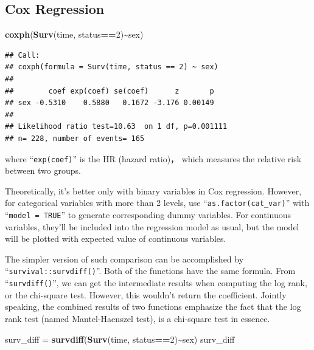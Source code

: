 \documentclass[
]{ctexart}
\newenvironment{Shaded}{\begin{snugshade}}{\end{snugshade}}
\newcommand{\DecValTok}[1]{\textcolor[rgb]{0.00,0.00,0.81}{#1}}
\newcommand{\FunctionTok}[1]{\textcolor[rgb]{0.13,0.29,0.53}{\textbf{#1}}}
\newcommand{\NormalTok}[1]{#1}
\newcommand{\OtherTok}[1]{\textcolor[rgb]{0.56,0.35,0.01}{#1}}
\newcommand{\SpecialCharTok}[1]{\textcolor[rgb]{0.81,0.36,0.00}{\textbf{#1}}}
\begin{document}
\hypertarget{cox-regression}{%
\subsection{Cox Regression}\label{cox-regression}}

\begin{Shaded}
\begin{Highlighting}[]
\FunctionTok{coxph}\NormalTok{(}\FunctionTok{Surv}\NormalTok{(time, status}\SpecialCharTok{==}\DecValTok{2}\NormalTok{)}\SpecialCharTok{\textasciitilde{}}\NormalTok{sex)}
\end{Highlighting}
\end{Shaded}

\begin{verbatim}
## Call:
## coxph(formula = Surv(time, status == 2) ~ sex)
## 
##        coef exp(coef) se(coef)      z       p
## sex -0.5310    0.5880   0.1672 -3.176 0.00149
## 
## Likelihood ratio test=10.63  on 1 df, p=0.001111
## n= 228, number of events= 165
\end{verbatim}

where ``\texttt{exp(coef)}'' is the HR (hazard ratio)， which measures
the relative risk between two groups.

Theoretically, it's better only with binary variables in Cox regression.
However, for categorical variables with more than 2 levels, use
``\texttt{as.factor(cat\_var)}'' with ``\texttt{model\ =\ TRUE}'' to
generate corresponding dummy variables. For continuous variables,
they'll be included into the regression model as usual, but the model
will be plotted with expected value of continuous variables.

The simpler version of such comparison can be accomplished by
``\texttt{survival::survdiff()}''. Both of the functions have the same
formula. From ``\texttt{survdiff()}'', we can get the intermediate
results when computing the log rank, or the chi-square test. However,
this wouldn't return the coefficient. Jointly speaking, the combined
results of two functions emphasize the fact that the log rank test
(named Mantel-Haenszel test), is a chi-square test in essence.

\begin{Shaded}
\begin{Highlighting}[]
\NormalTok{surv\_diff }\OtherTok{=} \FunctionTok{survdiff}\NormalTok{(}\FunctionTok{Surv}\NormalTok{(time, status}\SpecialCharTok{==}\DecValTok{2}\NormalTok{)}\SpecialCharTok{\textasciitilde{}}\NormalTok{sex)}
\NormalTok{surv\_diff}
\end{Highlighting}
\end{Shaded}
\end{document}
